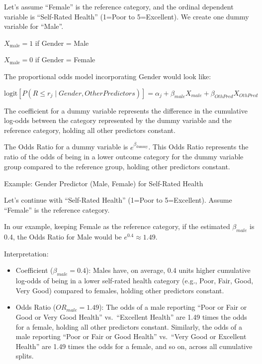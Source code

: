 \documentclass[
  letterpaper,
  DIV=11,
  numbers=noendperiod]{scrartcl}
\begin{document}
Let's assume ``Female'' is the reference category, and the ordinal
dependent variable is ``Self-Rated Health'' (1=Poor to 5=Excellent). We
create one dummy variable for ``Male''.

\(X_{\text{male}}=1\) if Gender = Male

\(X_{\text{male}}=0\) if Gender = Female

The proportional odds model incorporating Gender would look like:

\[\text{logit}[P(R\leq r_j∣Gender,Other Predictors)] = \alpha_j + \beta_{male}X_{male} + \beta_{OthPred}X_{OthPred} \]

The coefficient for a dummy variable represents the difference in the
cumulative log-odds between the category represented by the dummy
variable and the reference category, holding all other predictors
constant.

The Odds Ratio for a dummy variable is \(e^{\beta_{\text{dummy}}}\).
This Odds Ratio represents the ratio of the odds of being in a lower
outcome category for the dummy variable group compared to the reference
group, holding other predictors constant.

Example: Gender Predictor (Male, Female) for Self-Rated Health

Let's continue with ``Self-Rated Health'' (1=Poor to 5=Excellent).
Assume ``Female'' is the reference category.

In our example, keeping Female as the reference category, if the
estimated \(\beta_{male}\) is 0.4, the Odds Ratio for Male would be
\(e^{0.4}\approx 1.49\).

Interpretation:

\begin{itemize}
\item
  Coefficient (\(\beta_{male}=0.4\)): Males have, on average, 0.4 units
  higher cumulative log-odds of being in a lower self-rated health
  category (e.g., Poor, Fair, Good, Very Good) compared to females,
  holding other predictors constant.
\item
  Odds Ratio (\(OR_{male}=1.49\)): The odds of a male reporting ``Poor
  or Fair or Good or Very Good Health'' vs.~``Excellent Health'' are
  1.49 times the odds for a female, holding all other predictors
  constant. Similarly, the odds of a male reporting ``Poor or Fair or
  Good Health'' vs.~``Very Good or Excellent Health'' are 1.49 times the
  odds for a female, and so on, across all cumulative splits.
\end{itemize}
\end{document}
